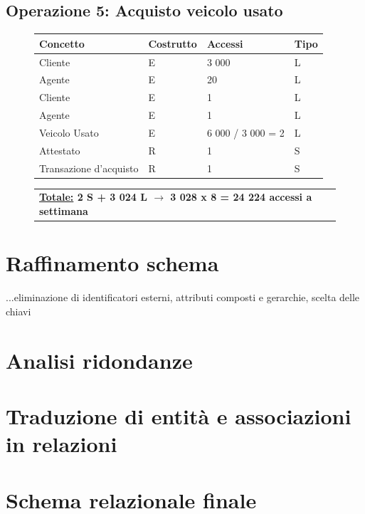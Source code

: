 \documentclass[a4paper,12pt]{report}
\begin{document}
\subsection*{Operazione 5: Acquisto veicolo usato}
\begin{figure}[ht]
	\centering
	\begin{tabular}{L{4.5cm}C{2cm}C{4.5cm}C{2cm}}
		\rule[-2mm]{0mm}{0.6cm}{}
		\textbf{Concetto} & \textbf{Costrutto} &\textbf{Accessi} & \textbf{Tipo} \\
		\hline\rule[-2mm]{0mm}{0.65cm}{}
		Cliente & E & 3 000 & L \\
		\hline\rule[-2mm]{0mm}{0.65cm}{}
		Agente & E & 20 & L \\
		\hline\rule[-2mm]{0mm}{0.65cm}{}
		Cliente & E & 1 & L \\
		\hline\rule[-2mm]{0mm}{0.65cm}{}
		Agente & E & 1 & L \\
		\hline\rule[-2mm]{0mm}{0.65cm}{}
		Veicolo Usato & E & 6 000 / 3 000 = 2 & L \\
		\hline\rule[-2mm]{0mm}{0.65cm}{}
		Attestato & R & 1 & S \\
		\hline\rule[-2mm]{0mm}{0.65cm}{}
		Transazione d'acquisto& R & 1 & S \\
	\end{tabular}
	
	\begin{tabular}{C{13.9cm}}
		\rule[-3mm]{0mm}{0.85cm}{}	
		 \textbf{\underline{Totale:} 2 S +  3 024 L $\to$ 3 028 x 8 = 24 224 accessi a settimana}
	\end{tabular}
\end{figure}

\section{Raffinamento schema}
...eliminazione di identificatori esterni, attributi composti e gerarchie, scelta delle chiavi

\section{Analisi ridondanze}

\section{Traduzione di entità e associazioni in relazioni}

\section{Schema relazionale finale}
\end{document}
